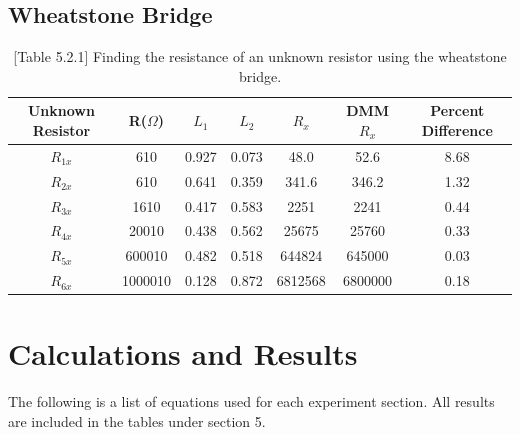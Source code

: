 \documentclass[titlepage]{article}
\begin{document}
	\subsection{Wheatstone Bridge} 
	\begin{table}[ht]
		\begin{center}
			\caption*{[Table 5.2.1] Finding the resistance of an unknown resistor using the wheatstone bridge.}
		\begin{tabular}{c|c|c|c|c|c|c}
			Unknown Resistor & R($\Omega$) & $L_1$ & $L_2$ & $R_x$ & DMM $R_x$ & Percent Difference \\
			\hline
			$R_{1x}$ & 610 & 0.927 & 0.073 & 48.0 & 52.6 & 8.68\\
			$R_{2x}$ & 610 & 0.641 & 0.359 & 341.6 & 346.2 & 1.32\\
			$R_{3x}$ & 1610 & 0.417&0.583& 2251& 2241& 0.44\\
			$R_{4x}$ & 20010 &0.438&0.562& 25675&25760&0.33\\
			$R_{5x}$ & 600010 &0.482&0.518& 644824&645000&0.03\\
			$R_{6x}$ & 1000010 &0.128&0.872& 6812568&6800000&0.18\\
		\end{tabular}
	\end{center}
	\end{table}
	\section{Calculations and Results}
	The following is a list of equations used for each experiment section. All results are included in the tables under section 5.
\end{document}
